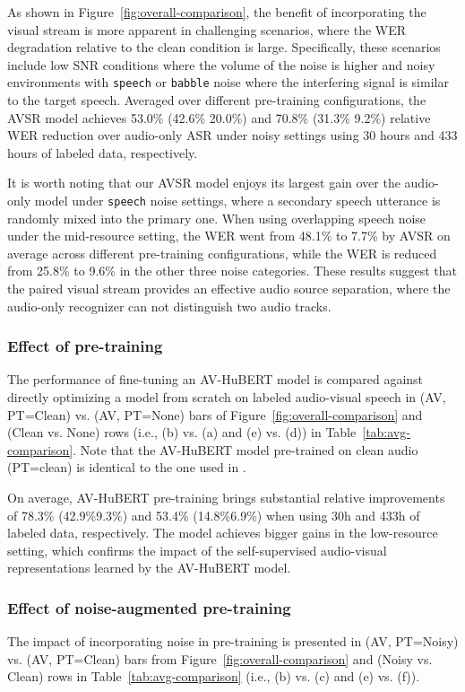 As shown in Figure~\ref{fig:overall-comparison}, the benefit of incorporating the visual stream is more apparent in challenging scenarios, where the WER degradation relative to the clean condition is large. Specifically, these scenarios include low SNR conditions where the volume of the noise is higher and noisy environments with \texttt{speech} or \texttt{babble} noise where the interfering signal is similar to the target speech. Averaged over different pre-training configurations, the AVSR model achieves 53.0\% (42.6\%  20.0\%) and 70.8\% (31.3\%  9.2\%) relative WER reduction over audio-only ASR under noisy settings using 30 hours and 433 hours of labeled data, respectively. 

It is worth noting that our AVSR model enjoys its largest gain over the audio-only model under \texttt{speech} noise settings, where a secondary speech utterance is randomly mixed into the primary one. When using overlapping speech noise under the mid-resource setting, the WER went from 48.1\% to 7.7\% by AVSR on average across different pre-training configurations, while the WER is reduced from 25.8\% to 9.6\% in the other three noise categories. These results suggest that the paired visual stream provides an effective audio source separation, where the audio-only recognizer can not distinguish two audio tracks.


\subsubsection{Effect of pre-training}
\label{sec:pre-train-vs-scratch}
The performance of fine-tuning an AV-HuBERT model is compared against directly optimizing a model from scratch on labeled audio-visual speech in (AV, PT=Clean) vs. (AV, PT=None) bars of Figure~\ref{fig:overall-comparison} and (Clean vs. None) rows (i.e., (b) vs. (a) and (e) vs. (d)) in Table~\ref{tab:avg-comparison}. Note that the AV-HuBERT model pre-trained on clean audio (PT=clean) is identical to the one used in \cite{avhubert}.

On average, AV-HuBERT pre-training brings substantial relative improvements of 78.3\% (42.9\%9.3\%) and 53.4\% (14.8\%6.9\%) when using 30h and 433h of labeled data, respectively. The model achieves bigger gains in the low-resource setting, which confirms the impact of the self-supervised audio-visual representations learned by the AV-HuBERT model. 


\subsubsection{Effect of noise-augmented pre-training}
The impact of incorporating noise in pre-training is presented in (AV, PT=Noisy) vs. (AV, PT=Clean) bars from Figure~\ref{fig:overall-comparison} and (Noisy vs. Clean) rows in Table~\ref{tab:avg-comparison} (i.e., (b) vs. (c) and (e) vs. (f)).

